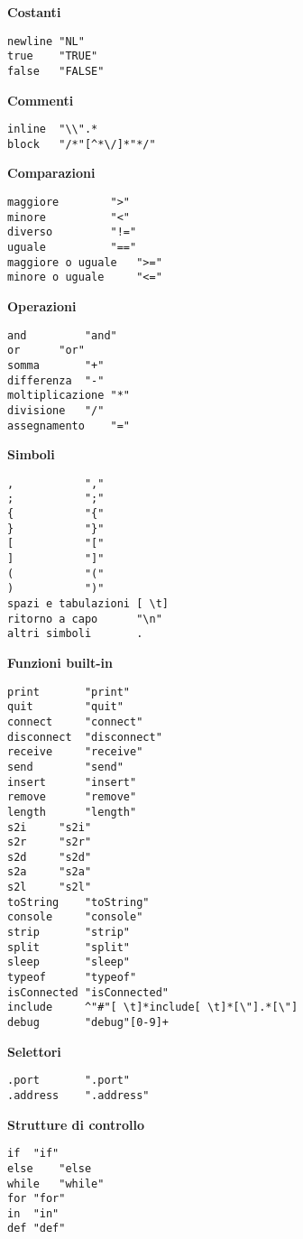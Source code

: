 \documentclass[10pt]{article}
\begin{document}
\textbf{Costanti}
\begin{lstlisting}[breaklines=true, postbreak=\mbox{{$\hookrightarrow$}\space}]
newline	"NL"
true	"TRUE"
false	"FALSE"
\end{lstlisting}

\textbf{Commenti}
\begin{lstlisting}[breaklines=true, postbreak=\mbox{{$\hookrightarrow$}\space}]
inline	"\\".*
block	"/*"[^*\/]*"*/"
\end{lstlisting}

\textbf{Comparazioni}
\begin{lstlisting}[breaklines=true, postbreak=\mbox{{$\hookrightarrow$}\space}]
maggiore		">"
minore			"<"
diverso			"!="
uguale			"=="
maggiore o uguale	">="
minore o uguale		"<="
\end{lstlisting}

\textbf{Operazioni}
\begin{lstlisting}[breaklines=true, postbreak=\mbox{{$\hookrightarrow$}\space}]
and 		"and"
or		"or"
somma		"+"
differenza	"-"
moltiplicazione	"*"
divisione	"/"
assegnamento	"="
\end{lstlisting}

\textbf{Simboli}
\begin{lstlisting}[breaklines=true, postbreak=\mbox{{$\hookrightarrow$}\space}]
,			","
;			";"
{			"{"
}			"}"
[			"["
]			"]"
(			"("
)			")"
spazi e tabulazioni	[ \t]
ritorno a capo		"\n"
altri simboli		.
\end{lstlisting}


\textbf{Funzioni built-in}
\begin{lstlisting}[breaklines=true, postbreak=\mbox{{$\hookrightarrow$}\space}]
print		"print" 
quit		"quit"
connect		"connect"
disconnect	"disconnect"
receive		"receive"
send		"send"
insert		"insert"
remove		"remove"
length		"length"
s2i		"s2i"
s2r		"s2r"
s2d		"s2d"
s2a		"s2a"	
s2l		"s2l"
toString	"toString"
console		"console"
strip		"strip"
split		"split"
sleep		"sleep"
typeof		"typeof"
isConnected	"isConnected"
include		^"#"[ \t]*include[ \t]*[\"].*[\"]
debug		"debug"[0-9]+
\end{lstlisting}

\textbf{Selettori}
\begin{lstlisting}[breaklines=true, postbreak=\mbox{{$\hookrightarrow$}\space}]
.port		".port"
.address	".address"
\end{lstlisting}

\textbf{Strutture di controllo}
\begin{lstlisting}[breaklines=true, postbreak=\mbox{{$\hookrightarrow$}\space}]
if	"if"
else	"else
while	"while"
for	"for"
in	"in"
def	"def"
\end{lstlisting}
\end{document}

